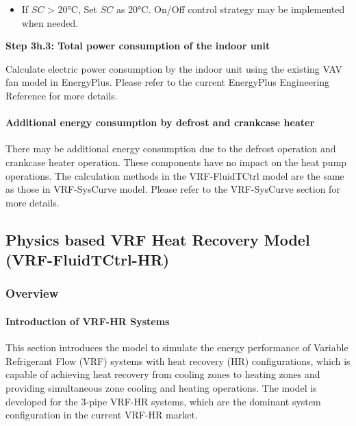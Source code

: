 \begin{itemize}
\tightlist
\item
  If \(SC\) \textgreater{} 20°C, Set \(SC\) as 20°C. On/Off control strategy may be implemented when needed.
\end{itemize}

\textbf{Step 3h.3: Total power consumption of the indoor unit} 

Calculate electric power consumption by the indoor unit using the existing VAV fan model in EnergyPlus. Please refer to the current EnergyPlus Engineering Reference for more details.

\paragraph{Additional energy consumption by defrost and crankcase heater}\label{additional-energy-consumption-by-defrost-and-crankcase-heater}

There may be additional energy consumption due to the defrost operation and crankcase heater operation. These components have no impact on the heat pump operations. The calculation methods in the VRF-FluidTCtrl model are the same as those in VRF-SysCurve model. Please refer to the VRF-SysCurve section for more details.



\subsection{Physics based VRF Heat Recovery Model (VRF-FluidTCtrl-HR)}\label{VRF-FluidTCtrl-HR}

\subsubsection{Overview}\label{VRF-FluidTCtrl-HR-overview}


\paragraph{Introduction of VRF-HR Systems}\label{Introduction-of-VRF-HR-Systems}

This section introduces the model to simulate the energy performance of Variable Refrigerant Flow (VRF) systems with heat recovery (HR) configurations, which is capable of achieving heat recovery from cooling zones to heating zones and providing simultaneous zone cooling and heating operations. The model is developed for the 3-pipe VRF-HR systems, which are the dominant system configuration in the current VRF-HR market. 

